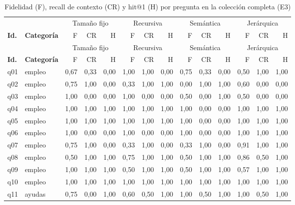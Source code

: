 \begin{footnotesize}
\setlength{\tabcolsep}{3pt}
\begin{longtable}{@{}l l rrr rrr rrr rrr@{}}
\caption{Fidelidad (F), recall de contexto (CR) y hit@1 (H) por pregunta en la colección completa (E3)}\label{tab:ap-e3}\\
\toprule
& & \multicolumn{3}{c}{Tamaño fijo} & \multicolumn{3}{c}{Recursiva} & \multicolumn{3}{c}{Semántica} & \multicolumn{3}{c}{Jerárquica} \\
\cmidrule(lr){3-5}\cmidrule(lr){6-8}\cmidrule(lr){9-11}\cmidrule(lr){12-14}
\textbf{Id.} & \textbf{Categoría} & F & CR & H & F & CR & H & F & CR & H & F & CR & H \\
\midrule
\endfirsthead
\toprule
& & \multicolumn{3}{c}{Tamaño fijo} & \multicolumn{3}{c}{Recursiva} & \multicolumn{3}{c}{Semántica} & \multicolumn{3}{c}{Jerárquica} \\
\cmidrule(lr){3-5}\cmidrule(lr){6-8}\cmidrule(lr){9-11}\cmidrule(lr){12-14}
\textbf{Id.} & \textbf{Categoría} & F & CR & H & F & CR & H & F & CR & H & F & CR & H \\
\midrule
\endhead
q01 & empleo & 0,67 & 0,33 & 0,00 & 1,00 & 1,00 & 0,00 & 0,75 & 0,33 & 0,00 & 0,50 & 1,00 & 1,00 \\
q02 & empleo & 0,75 & 1,00 & 0,00 & 0,33 & 1,00 & 1,00 & 0,00 & 1,00 & 1,00 & 0,60 & 0,00 & 0,00 \\
q03 & empleo & 1,00 & 0,00 & 0,00 & 1,00 & 0,00 & 0,00 & 0,50 & 0,00 & 1,00 & 0,50 & 0,00 & 0,00 \\
q04 & empleo & 1,00 & 1,00 & 1,00 & 1,00 & 1,00 & 1,00 & 1,00 & 0,00 & 0,00 & 1,00 & 1,00 & 1,00 \\
q05 & empleo & 1,00 & 1,00 & 1,00 & 1,00 & 1,00 & 1,00 & 1,00 & 0,00 & 0,00 & 1,00 & 1,00 & 1,00 \\
q06 & empleo & 1,00 & 0,00 & 0,00 & 1,00 & 0,00 & 0,00 & 1,00 & 0,00 & 0,00 & 1,00 & 1,00 & 1,00 \\
q07 & empleo & 0,75 & 1,00 & 0,00 & 0,33 & 1,00 & 0,00 & 0,33 & 1,00 & 0,00 & 0,91 & 1,00 & 1,00 \\
q08 & empleo & 0,50 & 1,00 & 1,00 & 0,75 & 1,00 & 1,00 & 0,50 & 1,00 & 1,00 & 0,86 & 0,50 & 1,00 \\
q09 & empleo & 1,00 & 1,00 & 1,00 & 0,50 & 1,00 & 1,00 & 0,50 & 1,00 & 1,00 & 0,57 & 1,00 & 1,00 \\
q10 & empleo & 1,00 & 1,00 & 1,00 & 1,00 & 1,00 & 1,00 & 1,00 & 1,00 & 1,00 & 1,00 & 1,00 & 1,00 \\
q11 & ayudas & 0,75 & 0,00 & 1,00 & 0,60 & 0,50 & 1,00 & 1,00 & 0,50 & 1,00 & 1,00 & 0,50 & 1,00 \\

\end{longtable}
\end{footnotesize}

